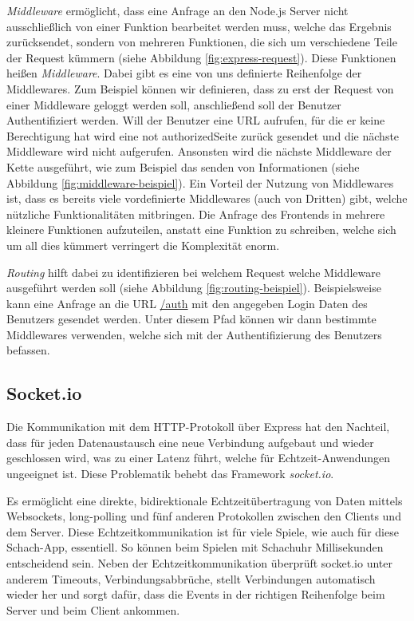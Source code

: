 \documentclass[a4paper,12pt]{report}
\begin{document}
\textit{Middleware} ermöglicht, dass eine Anfrage an den Node.js Server nicht ausschließlich von einer Funktion bearbeitet werden muss, welche das Ergebnis zurücksendet, sondern von mehreren Funktionen, die sich um verschiedene Teile der Request kümmern (siehe Abbildung \ref{fig:express-request}). Diese Funktionen heißen \textit{Middleware}. Dabei gibt es eine von uns definierte Reihenfolge der Middlewares. Zum Beispiel können wir definieren, dass zu erst der Request von einer Middleware geloggt werden soll, anschließend soll der Benutzer Authentifiziert werden. Will der Benutzer eine URL aufrufen, für die er keine Berechtigung hat wird eine \glqq not authorized\grqq{ }Seite zurück gesendet und die nächste Middleware wird nicht aufgerufen. Ansonsten wird die nächste Middleware der Kette ausgeführt, wie zum Beispiel das senden von Informationen (siehe Abbildung \ref{fig:middleware-beispiel}). Ein Vorteil der Nutzung von Middlewares ist, dass es bereits viele vordefinierte Middlewares (auch von Dritten) gibt, welche nützliche Funktionalitäten mitbringen. Die Anfrage des Frontends in mehrere kleinere Funktionen aufzuteilen, anstatt eine Funktion zu schreiben, welche sich um all dies kümmert verringert die Komplexität enorm.

\textit{Routing} hilft dabei zu identifizieren bei welchem Request welche Middleware ausgeführt	werden soll (siehe Abbildung \ref{fig:routing-beispiel}). Beispielsweise kann eine Anfrage an die URL \url{/auth} mit den angegeben Login Daten des Benutzers gesendet werden. Unter diesem Pfad können wir dann bestimmte Middlewares verwenden, welche sich mit der Authentifizierung des Benutzers befassen.
        \subsection{Socket.io}
        \label{sec:socket.io}
Die Kommunikation mit dem HTTP-Protokoll über Express hat den Nachteil, dass für jeden Datenaustausch eine neue Verbindung aufgebaut und wieder geschlossen wird, was zu einer Latenz führt, welche für Echtzeit-Anwendungen ungeeignet ist. Diese Problematik behebt das Framework \textit{socket.io}. %

Es ermöglicht eine direkte, bidirektionale Echtzeitübertragung von Daten mittels Websockets, long-polling und fünf anderen Protokollen zwischen den Clients und dem Server. Diese Echtzeitkommunikation ist für viele Spiele, wie auch für diese Schach-App, essentiell. So können beim Spielen mit Schachuhr Millisekunden entscheidend sein.
Neben der Echtzeitkommunikation überprüft socket.io unter anderem Timeouts, Verbindungsabbrüche, stellt Verbindungen automatisch wieder her und sorgt dafür, dass die Events in der richtigen Reihenfolge beim Server und beim Client ankommen. 
\end{document}
